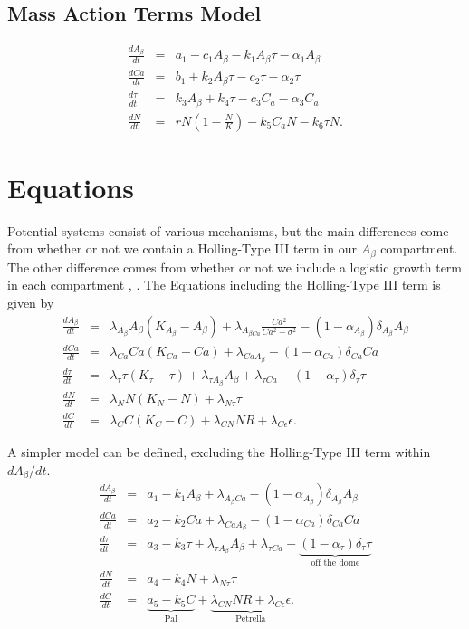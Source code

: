 \subsection{Mass Action Terms Model}
\begin{eqnarray}
    \frac{dA _{\beta}}{dt}&=&a _{1}-c _{1}A _{\beta}-k _{1}A _{\beta}\tau - \alpha _{1}A _{\beta}\\
    \frac{dCa}{dt}&=& b _{1}+ k _{2} A _{\beta}\tau - c _{2}\tau - \alpha _{2} \tau\\
    \frac{d \tau}{dt}&=&k _{3}A _{\beta}+k _{4}\tau - c _{3}C _{a}- \alpha _{3}C _{a}\\
    \frac{dN}{dt}&=&rN \left(1 - \frac{N}{K}\right)- k _{5}C _{a}N- k _{6}\tau N.
\end{eqnarray}
\section{Equations}
Potential systems consist of various mechanisms, but the main differences come from whether or not we contain a Holling-Type III term in our $A_ \beta$ compartment. 
The other difference comes from whether or not we include a logistic growth term in each compartment \cite{petrella2019computational}, \cite{pal2025nonequilibrium}.
The Equations including the Holling-Type III term is given by 
\begin{eqnarray}
    \frac{dA _{\beta}}{dt}&=&\lambda _{A _{\beta}}A _{\beta}(K _{A _{\beta}}-A _{\beta})+\lambda _{A _{\beta Ca}}\frac{Ca ^{2}}{Ca ^{2}+\sigma ^{2}}-(1-\alpha _{A _{\beta}})\delta _{A _{\beta}}A _{\beta}\\
    \frac{dCa}{dt}&=& \lambda _{Ca}Ca (K _{Ca}-Ca)+\lambda _{CaA _{\beta}}-(1-\alpha _{Ca})\delta _{Ca} Ca\\
    \frac{d \tau}{dt}&=&\lambda _{\tau}\tau (K _{\tau}-\tau)+\lambda _{\tau A _{\beta}}A _{\beta}+\lambda _{\tau Ca}-(1-\alpha _{\tau})\delta _{\tau}\tau\\
    \frac{dN}{dt}&=&\lambda _{N}N (K _{N}-N) + \lambda _{N\tau} \tau\\
    \frac{dC}{dt}&=&\lambda _{C}C (K _{C}-C)+\lambda _{CN}NR+\lambda _{C\epsilon}\epsilon.
\end{eqnarray}

A simpler model can be defined, excluding the Holling-Type III term within $dA _{\beta}/dt$.
\begin{eqnarray}
    \frac{dA _{\beta}}{dt}&=&a _{1}-k _{1}A _{\beta}+\lambda _{A _{\beta}Ca}-(1-\alpha _{A _{\beta}})\delta _{A _{\beta}}A _{\beta}\\
    \frac{dCa}{dt}&=&a _{2} -k _{2}Ca+\lambda _{CaA _{\beta}}-(1-\alpha _{Ca})\delta _{Ca} Ca\\
\frac{d \tau}{dt}&=&a _{3}-k _{3}\tau+\lambda _{\tau A _{\beta}}A _{\beta}+\lambda _{\tau Ca}-\underbrace{(1-\alpha _{\tau})\delta _{\tau}\tau}_{\text{off the dome}}\\
    \frac{dN}{dt}&=&a _{4}-k _{4}N+ \lambda _{N\tau} \tau\\
    \frac{dC}{dt}&=&\underbrace{a _{5}-k _{5}C}_{\text{Pal}}+\underbrace{\lambda _{CN}NR+\lambda _{C\epsilon}\epsilon}_{\text{Petrella}}.
\end{eqnarray}

